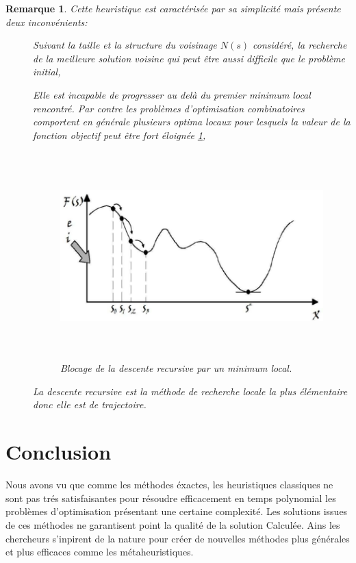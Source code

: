 \documentclass[a4paper,11pt,oneside]{report}
\newtheorem{remarque}{Remarque}[section]
\theoremstyle{plain}
\newcommand{\0}{/ \! \! \! 0}
\theoremstyle{plain}
\begin{document}
\begin{remarque}
Cette heuristique est caract\'eris\'ee par sa simplicit\'e mais pr\'esente deux inconv\'enients:
\begin{description}
 \item[] Suivant la taille et la structure du voisinage $N(s)$ consid\'er\'e, la recherche de la meilleure solution voisine qui peut \^etre 
 aussi difficile que le probl\`eme initial,
 \item[] Elle est incapable de progresser au del\`a du premier minimum local rencontr\'e. Par contre les probl\`emes d'optimisation 
 combinatoires comportent en g\'en\'erale plusieurs optima locaux pour lesquels la valeur de la fonction objectif peut \^etre fort \'eloign\'ee 
 \ref{descent},
  \begin{figure}[htbp]
  \begin{center}
  \includegraphics[height=8cm,width=15cm]{descent.png}
  \caption{\label{descent} Blocage de la descente recursive par un minimum local.}
  \end{center}
  \end{figure}
 \item [] La descente recursive est la m\'ethode de recherche locale la plus \'el\'ementaire donc elle est de trajectoire.
\end{description}
\end{remarque}
\newpage
\section{Conclusion}
Nous avons vu que comme les m\'ethodes \'exactes, les heuristiques classiques ne sont pas tr\'es satisfaisantes pour r\'esoudre efficacement en temps polynomial
 les probl\`emes d'optimisation pr\'esentant une certaine complexit\'e. Les solutions issues de ces m\'ethodes ne garantisent point la qualit\'e de la
  solution Calcul\'ee. Ains les chercheurs s'inpirent de la nature pour cr\'eer de nouvelles m\'ethodes plus g\'en\'erales et plus efficaces comme 
  les m\'etaheuristiques.
\end{document}
